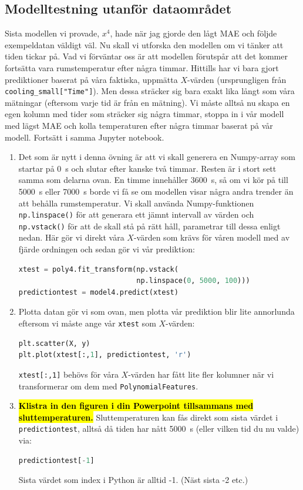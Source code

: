 \documentclass{article}
\begin{document}
\subsection{Modelltestning utanför dataområdet}
Sista modellen vi provade, $x^4$, hade när jag gjorde den lågt MAE och följde exempeldatan väldigt väl. Nu skall vi utforska den modellen om vi tänker att tiden tickar på. Vad vi förväntar oss är att modellen förutspår att det kommer fortsätta vara rumstemperatur efter några timmar. Hittills har vi bara gjort prediktioner baserat på våra faktiska, uppmätta $X$-värden 
(ursprungligen från \verb|cooling_small["Time"]|). 
Men dessa sträcker sig bara exakt lika långt som våra mätningar (eftersom varje tid är från en mätning). Vi måste alltså nu skapa en egen kolumn med tider som sträcker sig några timmar, stoppa in i vår modell med lägst MAE och kolla temperaturen efter några timmar baserat på vår modell. Fortsätt i samma Jupyter notebook.
\begin{enumerate}
    \item Det som är nytt i denna övning är att vi skall generera en Numpy-array som startar på \qty{0}{\s} och slutar efter kanske två timmar. Resten är i stort sett samma som delarna ovan. En timme innehåller \qty{3600}{\s}, så om vi kör på till \qty{5000}{\s} eller \qty{7000}{\s} borde vi få se om modellen visar några andra trender än att behålla rumstemperatur. Vi skall använda Numpy-funktionen \texttt{np.linspace()} för att generara ett jämnt intervall av värden och \texttt{np.vstack()} för att de skall stå på rätt håll, parametrar till dessa enligt nedan. Här gör vi direkt våra $X$-värden som krävs för våren modell med av fjärde ordningen och sedan gör vi vår prediktion:
    \begin{lstlisting}[language=Python]
xtest = poly4.fit_transform(np.vstack(
                            np.linspace(0, 5000, 100)))
predictiontest = model4.predict(xtest)
\end{lstlisting}
    \item Plotta datan gör vi som ovan, men plotta vår prediktion blir lite annorlunda eftersom vi måste ange vår \texttt{xtest} som $X$-värden:
    \begin{lstlisting}[language=Python]
plt.scatter(X, y)
plt.plot(xtest[:,1], predictiontest, 'r')
\end{lstlisting}
    \texttt{xtest[:,1]} behövs för våra $X$-värden har fått lite fler kolumner när vi transformerar om dem med \texttt{PolynomialFeatures}.
    \item \hl{\textbf{Klistra in den figuren i din Powerpoint tillsammans med sluttemperaturen.}} Sluttemperaturen kan fås direkt som sista värdet i \texttt{predictiontest}, alltså då tiden har nått \qty{5000}{\s} (eller vilken tid du nu valde) via: 
    \begin{lstlisting}[language=Python]
predictiontest[-1]
\end{lstlisting}
    Sista värdet som index i Python är alltid -1. (Näst sista -2 etc.)
\end{enumerate}
\end{document}
